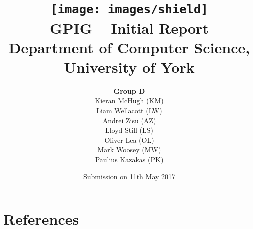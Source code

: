 \documentclass[twoside,a4paper,12pt]{article}
\begin{document}
	\title{ 
	\vspace{1cm}
	{\texttt{[image: images/shield]}} \\
	\vspace{1.5cm}
	{GPIG -- Initial Report}\\
	{\large Department of Computer Science, University of York}\\
	\vspace{1cm}
    }
    \author{\textbf{Group D} \\ Kieran McHugh (KM) \\ Liam Wellacott (LW) \\ Andrei Zisu (AZ) \\ Lloyd Still (LS) \\ Oliver Lea (OL) \\ Mark Woosey (MW) \\ Paulius Kazakas (PK) }
    \date{Submission on 11th May 2017}
    \maketitle 

    \thispagestyle{empty}
    
    \setlength{\parskip}{0.5em}
    
    \newpage
    \tableofcontents
    
	\newpage

	

	
	
	\newpage
	
	
	\newpage
	
	
	\newpage
	
	
	\newpage
	
		
	\newpage
	
	
	\newpage
	
	
	\newpage
	
	
	\newpage
	
		
	\newpage
	\section*{References}
	
	\printbibliography[heading=none]
\end{document}
